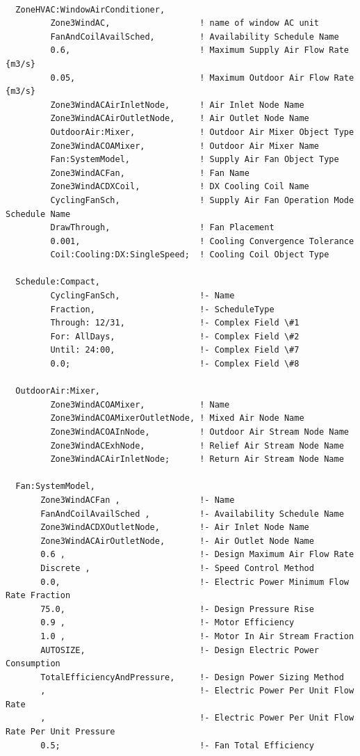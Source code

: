 \begin{lstlisting}

  ZoneHVAC:WindowAirConditioner,
         Zone3WindAC,                  ! name of window AC unit
         FanAndCoilAvailSched,         ! Availability Schedule Name
         0.6,                          ! Maximum Supply Air Flow Rate {m3/s}
         0.05,                         ! Maximum Outdoor Air Flow Rate {m3/s}
         Zone3WindACAirInletNode,      ! Air Inlet Node Name
         Zone3WindACAirOutletNode,     ! Air Outlet Node Name
         OutdoorAir:Mixer,             ! Outdoor Air Mixer Object Type
         Zone3WindACOAMixer,           ! Outdoor Air Mixer Name
         Fan:SystemModel,              ! Supply Air Fan Object Type
         Zone3WindACFan,               ! Fan Name
         Zone3WindACDXCoil,            ! DX Cooling Coil Name
         CyclingFanSch,                ! Supply Air Fan Operation Mode Schedule Name
         DrawThrough,                  ! Fan Placement
         0.001,                        ! Cooling Convergence Tolerance
         Coil:Cooling:DX:SingleSpeed;  ! Cooling Coil Object Type

  Schedule:Compact,
         CyclingFanSch,                !- Name
         Fraction,                     !- ScheduleType
         Through: 12/31,               !- Complex Field \#1
         For: AllDays,                 !- Complex Field \#2
         Until: 24:00,                 !- Complex Field \#7
         0.0;                          !- Complex Field \#8

  OutdoorAir:Mixer,
         Zone3WindACOAMixer,           ! Name
         Zone3WindACOAMixerOutletNode, ! Mixed Air Node Name
         Zone3WindACOAInNode,          ! Outdoor Air Stream Node Name
         Zone3WindACExhNode,           ! Relief Air Stream Node Name
         Zone3WindACAirInletNode;      ! Return Air Stream Node Name

  Fan:SystemModel,
       Zone3WindACFan ,                !- Name
       FanAndCoilAvailSched ,          !- Availability Schedule Name
       Zone3WindACDXOutletNode,        !- Air Inlet Node Name
       Zone3WindACAirOutletNode,       !- Air Outlet Node Name
       0.6 ,                           !- Design Maximum Air Flow Rate
       Discrete ,                      !- Speed Control Method
       0.0,                            !- Electric Power Minimum Flow Rate Fraction
       75.0,                           !- Design Pressure Rise
       0.9 ,                           !- Motor Efficiency
       1.0 ,                           !- Motor In Air Stream Fraction
       AUTOSIZE,                       !- Design Electric Power Consumption
       TotalEfficiencyAndPressure,     !- Design Power Sizing Method
       ,                               !- Electric Power Per Unit Flow Rate
       ,                               !- Electric Power Per Unit Flow Rate Per Unit Pressure
       0.5;                            !- Fan Total Efficiency


\end{lstlisting}
